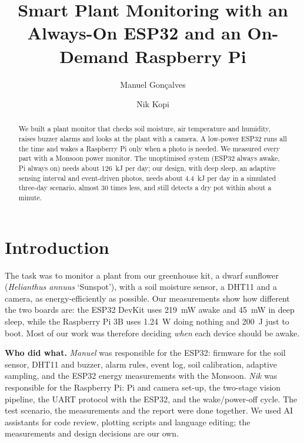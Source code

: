 \documentclass[runningheads]{llncs}
\begin{document}
\title{Smart Plant Monitoring with an Always-On ESP32 and an On-Demand Raspberry Pi}
\author{Manuel Gon\c{c}alves \and Nik Kopi}

\maketitle

\begin{abstract}
We built a plant monitor that checks soil moisture, air temperature and humidity, raises buzzer alarms and looks at the plant with a camera. A low-power ESP32 runs all the time and wakes a Raspberry Pi only when a photo is needed. We measured every part with a Monsoon power monitor. The unoptimised system (ESP32 always awake, Pi always on) needs about \SI{126}{kJ} per day; our design, with deep sleep, an adaptive sensing interval and event-driven photos, needs about \SI{4.4}{kJ} per day in a simulated three-day scenario, almost 30 times less, and still detects a dry pot within about a minute.
\end{abstract}

\section{Introduction}

The task was to monitor a plant from our greenhouse kit, a dwarf sunflower (\emph{Helianthus annuus} `Sunspot'), with a soil moisture sensor, a DHT11 and a camera, as energy-efficiently as possible. Our measurements show how different the two boards are: the ESP32 DevKit uses \SI{219}{mW} awake and \SI{45}{mW} in deep sleep, while the Raspberry Pi 3B uses \SI{1.24}{W} doing nothing and \SI{200}{J} just to boot. Most of our work was therefore deciding \emph{when} each device should be awake.

\noindent\textbf{Who did what.} \emph{Manuel} was responsible for the ESP32: firmware for the soil sensor, DHT11 and buzzer, alarm rules, event log, soil calibration, adaptive sampling, and the ESP32 energy measurements with the Monsoon. \emph{Nik} was responsible for the Raspberry Pi: Pi and camera set-up, the two-stage vision pipeline, the UART protocol with the ESP32, and the wake/power-off cycle. The test scenario, the measurements and the report were done together. We used AI assistants for code review, plotting scripts and language editing; the measurements and design decisions are our own.
\end{document}

